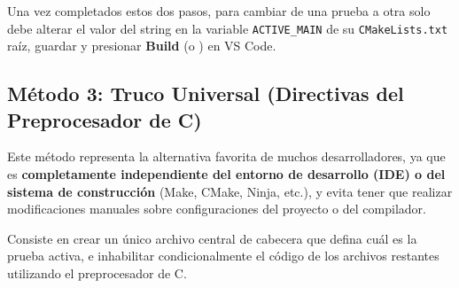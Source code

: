 \documentclass[
10pt, %
a4paper, %
oneside, %
headinclude,footinclude, %
BCOR5mm, %
]{scrartcl}
\begin{document}
Una vez completados estos dos pasos, para cambiar de una prueba a otra solo debe alterar el valor del string en la variable \texttt{ACTIVE\_MAIN} de su \texttt{CMakeLists.txt} raíz, guardar y presionar \textbf{Build} (o ) en VS Code.

\subsection{Método 3: Truco Universal (Directivas del Preprocesador de C)}
Este método representa la alternativa favorita de muchos desarrolladores, ya que es \textbf{completamente independiente del entorno de desarrollo (IDE) o del sistema de construcción} (Make, CMake, Ninja, etc.), y evita tener que realizar modificaciones manuales sobre configuraciones del proyecto o del compilador.

Consiste en crear un único archivo central de cabecera que defina cuál es la prueba activa, e inhabilitar condicionalmente el código de los archivos restantes utilizando el preprocesador de C.
\end{document}
